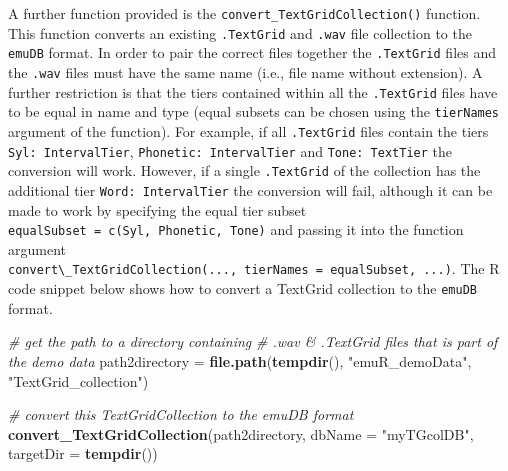 \documentclass[]{book}
\newenvironment{Shaded}{\begin{snugshade}}{\end{snugshade}}
\newcommand{\CommentTok}[1]{\textcolor[rgb]{0.56,0.35,0.01}{\textit{#1}}}
\newcommand{\DataTypeTok}[1]{\textcolor[rgb]{0.13,0.29,0.53}{#1}}
\newcommand{\KeywordTok}[1]{\textcolor[rgb]{0.13,0.29,0.53}{\textbf{#1}}}
\newcommand{\NormalTok}[1]{#1}
\newcommand{\StringTok}[1]{\textcolor[rgb]{0.31,0.60,0.02}{#1}}
\begin{document}
A further function provided is the \texttt{convert\_TextGridCollection()} function. This function converts an existing \texttt{.TextGrid} and \texttt{.wav} file collection to the \texttt{emuDB} format. In order to pair the correct files together the \texttt{.TextGrid} files and the \texttt{.wav} files must have the same name (i.e., file name without extension). A further restriction is that the tiers contained within all the \texttt{.TextGrid} files have to be equal in name and type (equal subsets can be chosen using the \texttt{tierNames} argument of the function). For example, if all \texttt{.TextGrid} files contain the tiers \texttt{Syl:\ IntervalTier}, \texttt{Phonetic:\ IntervalTier} and \texttt{Tone:\ TextTier} the conversion will work. However, if a single \texttt{.TextGrid} of the collection has the additional tier \texttt{Word:\ IntervalTier} the conversion will fail, although it can be made to work by specifying the equal tier subset \texttt{equalSubset\ =\ c(\textquotesingle{}Syl\textquotesingle{},\ \textquotesingle{}Phonetic\textquotesingle{},\ \textquotesingle{}Tone\textquotesingle{})} and passing it into the function argument \texttt{convert\textbackslash{}\_TextGridCollection(...,\ tierNames\ =\ equalSubset,\ ...)}. The R code snippet below shows how to convert a TextGrid collection to the \texttt{emuDB} format.

\begin{Shaded}
\begin{Highlighting}[]
\CommentTok{# get the path to a directory containing}
\CommentTok{# .wav & .TextGrid files that is part of the demo data}
\NormalTok{path2directory =}\StringTok{ }\KeywordTok{file.path}\NormalTok{(}\KeywordTok{tempdir}\NormalTok{(),}
                           \StringTok{"emuR_demoData"}\NormalTok{,}
                           \StringTok{"TextGrid_collection"}\NormalTok{)}

\CommentTok{# convert this TextGridCollection to the emuDB format}
\KeywordTok{convert_TextGridCollection}\NormalTok{(path2directory, }\DataTypeTok{dbName =} \StringTok{"myTGcolDB"}\NormalTok{,}
                           \DataTypeTok{targetDir =} \KeywordTok{tempdir}\NormalTok{())}
\end{Highlighting}
\end{Shaded}
\end{document}
